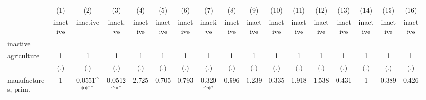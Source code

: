 {
\def\sym#1{\ifmmode^{#1}\else\(^{#1}\)\fi}
\begin{tabular}{l*{16}{c}}
\hline\hline
                    &\multicolumn{1}{c}{(1)}&\multicolumn{1}{c}{(2)}&\multicolumn{1}{c}{(3)}&\multicolumn{1}{c}{(4)}&\multicolumn{1}{c}{(5)}&\multicolumn{1}{c}{(6)}&\multicolumn{1}{c}{(7)}&\multicolumn{1}{c}{(8)}&\multicolumn{1}{c}{(9)}&\multicolumn{1}{c}{(10)}&\multicolumn{1}{c}{(11)}&\multicolumn{1}{c}{(12)}&\multicolumn{1}{c}{(13)}&\multicolumn{1}{c}{(14)}&\multicolumn{1}{c}{(15)}&\multicolumn{1}{c}{(16)}\\
                    &\multicolumn{1}{c}{inactive}&\multicolumn{1}{c}{inactive}&\multicolumn{1}{c}{inactive}&\multicolumn{1}{c}{inactive}&\multicolumn{1}{c}{inactive}&\multicolumn{1}{c}{inactive}&\multicolumn{1}{c}{inactive}&\multicolumn{1}{c}{inactive}&\multicolumn{1}{c}{inactive}&\multicolumn{1}{c}{inactive}&\multicolumn{1}{c}{inactive}&\multicolumn{1}{c}{inactive}&\multicolumn{1}{c}{inactive}&\multicolumn{1}{c}{inactive}&\multicolumn{1}{c}{inactive}&\multicolumn{1}{c}{inactive}\\
\hline
inactive            &                     &                     &                     &                     &                     &                     &                     &                     &                     &                     &                     &                     &                     &                     &                     &                     \\
agriculture         &           1         &           1         &           1         &           1         &           1         &           1         &           1         &           1         &           1         &           1         &           1         &           1         &           1         &           1         &           1         &           1         \\
                    &         (.)         &         (.)         &         (.)         &         (.)         &         (.)         &         (.)         &         (.)         &         (.)         &         (.)         &         (.)         &         (.)         &         (.)         &         (.)         &         (.)         &         (.)         &         (.)         \\
[1em]
manufactures, prim. &           1         &      0.0551\sym{**} &      0.0512\sym{*}  &       2.725         &       0.705         &       0.793         &       0.320\sym{*}  &       0.696         &       0.239         &       0.335         &       1.918         &       1.538         &       0.431         &           1         &       0.389         &       0.426         \\

\end{tabular}}
